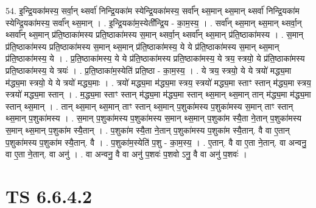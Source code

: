 \documentclass[17pt]{extarticle}
\begin{document}
54. इ॒न्द्रि॒यका॑मस्य॒ सर्वा॒न् थ्सर्वा॑ निन्द्रि॒यका॑म स्येन्द्रि॒यका॑मस्य॒ सर्वा᳚न् थ्स॒मान् थ्स॒मान् थ्सर्वा॑ निन्द्रि॒यका॑म स्येन्द्रि॒यका॑मस्य॒ सर्वा᳚न् थ्स॒मान् । . इ॒न्द्रि॒यका॑म॒स्येती᳚न्द्रि॒य - का॒म॒स्य॒ । . सर्वा᳚न् थ्स॒मान् थ्स॒मान् थ्सर्वा॒न् थ्सर्वा᳚न् थ्स॒मान् प्र॑ति॒ष्ठाका॑मस्य प्रति॒ष्ठाका॑मस्य स॒मान् थ्सर्वा॒न् थ्सर्वा᳚न् थ्स॒मान् प्र॑ति॒ष्ठाका॑मस्य । . स॒मान् प्र॑ति॒ष्ठाका॑मस्य प्रति॒ष्ठाका॑मस्य स॒मान् थ्स॒मान् प्र॑ति॒ष्ठाका॑मस्य॒ ये ये प्र॑ति॒ष्ठाका॑मस्य स॒मान् थ्स॒मान् प्र॑ति॒ष्ठाका॑मस्य॒ ये । . प्र॒ति॒ष्ठाका॑मस्य॒ ये ये प्र॑ति॒ष्ठाका॑मस्य प्रति॒ष्ठाका॑मस्य॒ ये त्रय॒ स्त्रयो॒ ये प्र॑ति॒ष्ठाका॑मस्य प्रति॒ष्ठाका॑मस्य॒ ये त्रयः॑ । . प्र॒ति॒ष्ठाका॑म॒स्येति॑ प्रति॒ष्ठा - का॒म॒स्य॒ । . ये त्रय॒ स्त्रयो॒ ये ये त्रयो॑ मद्ध्य॒मा म॑द्ध्य॒मा स्त्रयो॒ ये ये त्रयो॑ मद्ध्य॒माः । . त्रयो॑ मद्ध्य॒मा म॑द्ध्य॒मा स्त्रय॒ स्त्रयो॑ मद्ध्य॒मा स्ताꣳ स्तान् म॑द्ध्य॒मा स्त्रय॒ स्त्रयो॑ मद्ध्य॒मा स्तान् । . म॒द्ध्य॒मा स्ताꣳ स्तान् म॑द्ध्य॒मा म॑द्ध्य॒मा स्तान् थ्स॒मान् थ्स॒मान् तान् म॑द्ध्य॒मा म॑द्ध्य॒मा स्तान् थ्स॒मान् । . तान् थ्स॒मान् थ्स॒मान् ताꣳ स्तान् थ्स॒मान् प॒शुका॑मस्य प॒शुका॑मस्य स॒मान् ताꣳ स्तान् थ्स॒मान् प॒शुका॑मस्य । . स॒मान् प॒शुका॑मस्य प॒शुका॑मस्य स॒मान् थ्स॒मान् प॒शुका॑म स्यै॒ता ने॒तान् प॒शुका॑मस्य स॒मान् थ्स॒मान् प॒शुका॑म स्यै॒तान् । . प॒शुका॑म स्यै॒ता ने॒तान् प॒शुका॑मस्य प॒शुका॑म स्यै॒तान्. वै वा ए॒तान् प॒शुका॑मस्य प॒शुका॑म स्यै॒तान्. वै । . प॒शुका॑म॒स्येति॑ प॒शु - का॒म॒स्य॒ । . ए॒तान्. वै वा ए॒ता ने॒तान्. वा अन्वनु॒ वा ए॒ता ने॒तान्. वा अनु॑ । . वा अन्वनु॒ वै वा अनु॑ प॒शवः॑ प॒शवो ऽनु॒ वै वा अनु॑ प॒शवः॑ । \newline
\pagebreak
{}

\section{ TS 6.6.4.2 }
\end{document}
